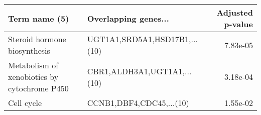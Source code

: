 \begin{tabular}{llr}
\toprule
                               Term name (5) &          Overlapping genes... &  Adjusted p-value \\
\midrule
                Steroid hormone biosynthesis & UGT1A1,SRD5A1,HSD17B1,...(10) &          7.83e-05 \\
Metabolism of xenobiotics by cytochrome P450 &   CBR1,ALDH3A1,UGT1A1,...(10) &          3.18e-04 \\
                                  Cell cycle &      CCNB1,DBF4,CDC45,...(10) &          1.55e-02 \\
\bottomrule
\end{tabular}

